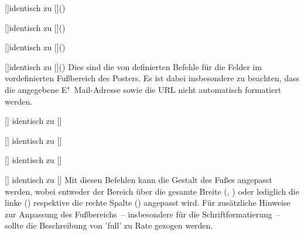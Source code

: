 \begin{Bundle*}{}
\begin{Declaration}{[]}{identisch zu 
  []()%
}
\begin{Declaration}{[]}{identisch zu 
  []()%
}
\begin{Declaration}{[]}{identisch zu 
  []()%
}
\begin{Declaration}{[]}{identisch zu 
  []()%
}
\printdeclarationlist%
%
Dies sind die von  definierten Befehle für die Felder im 
vordefinierten Fußbereich des Posters. Es ist dabei insbesondere zu beachten, 
dass die angegebene E"~Mail-Adresse sowie die URL nicht automatisch formatiert 
werden.
\end{Declaration}
\end{Declaration}
\end{Declaration}
\end{Declaration}

\begin{Declaration}{[]}{%
  identisch zu []
}
\begin{Declaration}{[]}{%
  identisch zu []
}
\begin{Declaration}{[]}{%
  identisch zu [\POParameter{*}]
}
\begin{Declaration}{[]}{%
  identisch zu [\PParameter{*}]
}
\printdeclarationlist%
%
Mit diesen Befehlen kann die Gestalt des Fußes angepasst werden, wobei entweder 
der Bereich über die gesamte Breite (, ) 
oder lediglich die linke () respektive die rechte Spalte 
() angepasst wird. Für zusätzliche Hinweise zur Anpassung 
des Fußbereichs~-- insbesondere für die Schriftformatierung~-- sollte die 
Beschreibung von 'full' zu Rate gezogen werden.
\end{Declaration}
\end{Declaration}
\end{Declaration}
\end{Declaration}



\end{Bundle*}
